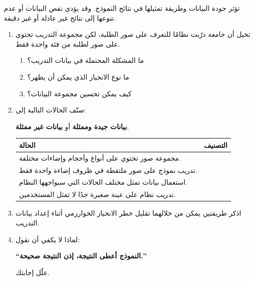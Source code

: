 \documentclass[a4paper]{article}
\begin{document}
تؤثر جودة البيانات وطريقة تمثيلها في نتائج النموذج.
وقد يؤدي نقص البيانات أو عدم تنوعها إلى نتائج غير عادلة
أو غير دقيقة.

\begin{enumerate}

\item تخيل أن جامعة درّبت نظامًا للتعرف على صور الطلبة،
لكن مجموعة التدريب تحتوي على صور لطلبة من فئة واحدة فقط.

\begin{enumerate}

    \item ما المشكلة المحتملة في بيانات التدريب؟
    
    \item ما نوع الانحياز الذي يمكن أن يظهر؟
    
    \item كيف يمكن تحسين مجموعة البيانات؟
    
\end{enumerate}


\item صنّف الحالات التالية إلى:

\textbf{بيانات جيدة وممثلة} أو \textbf{بيانات غير ممثلة}.

\begin{center}

\begin{tabular}{|
>{\raggedleft\arraybackslash}m{9.5cm}|
>{\centering\arraybackslash}m{5cm}|}

\hline
\textbf{الحالة} & \textbf{التصنيف} \\

\hline
مجموعة صور تحتوي على أنواع وأحجام وإضاءات مختلفة.
& \\[0.4cm]
\hline

تدريب نموذج على صور ملتقطة في ظروف إضاءة واحدة فقط.
& \\[0.4cm]
\hline

استعمال بيانات تمثل مختلف الحالات التي سيواجهها النظام.
& \\[0.4cm]
\hline

تدريب نظام على عينة صغيرة جدًا لا تمثل المستخدمين.
& \\[0.4cm]
\hline

\end{tabular}

\end{center}


\item اذكر طريقتين يمكن من خلالهما تقليل خطر الانحياز
الخوارزمي أثناء إعداد بيانات التدريب.


\item لماذا لا يكفي أن نقول:
\begin{center}
\textbf{``النموذج أعطى النتيجة، إذن النتيجة صحيحة.''}
\end{center}

علّل إجابتك.

\end{enumerate}

\newpage
\end{document}
